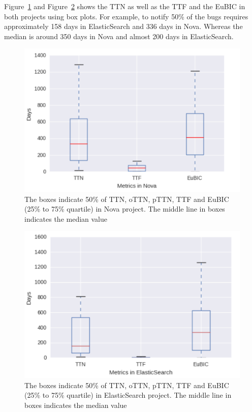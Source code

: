 \documentclass[10pt, conference]{IEEEtran}
\begin{document}
Figure~\ref{fig:meansOfNova} and Figure~\ref{fig:meansOfES} shows the TTN as well as the TTF and the EuBIC in both projects using box plots. For example, to notify 50\% of the bugs requires approximately 158 days in ElasticSearch and 336 days in Nova. Whereas the median is around 350 days in Nova and almost 200 days in ElasticSearch.  

\begin{figure}[ht]
\centering
\includegraphics[width=\columnwidth]{boxplotNova.png}
\caption{The boxes indicate 50\% of TTN, oTTN, pTTN, TTF and EuBIC (25\% to 75\% quartile) in Nova project. The middle line in boxes indicates the median value}
\label{fig:meansOfNova}       %
\end{figure}

\begin{figure}[ht]
\centering
\includegraphics[width=\columnwidth]{boxplotES.png}
\caption{The boxes indicate 50\% of TTN, oTTN, pTTN, TTF and EuBIC (25\% to 75\% quartile) in ElasticSearch project. The middle line in boxes indicates the median value}
\label{fig:meansOfES}       %
\end{figure}
\end{document}
